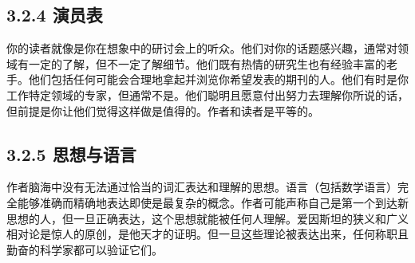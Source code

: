 \subsection*{3.2.4 演员表}
你的读者就像是你在想象中的研讨会上的听众。他们对你的话题感兴趣，通常对领域有一定的了解，但不一定了解细节。他们既有热情的研究生也有经验丰富的老手。他们包括任何可能会合理地拿起并浏览你希望发表的期刊的人。他们有时是你工作特定领域的专家，但通常不是。他们聪明且愿意付出努力去理解你所说的话，但前提是你让他们觉得这样做是值得的。作者和读者是平等的。

\subsection*{3.2.5 思想与语言}
作者脑海中没有无法通过恰当的词汇表达和理解的思想。语言（包括数学语言）完全能够准确而精确地表达即使是最复杂的概念。作者可能声称自己是第一个到达新思想的人，但一旦正确表达，这个思想就能被任何人理解。爱因斯坦的狭义和广义相对论是惊人的原创，是他天才的证明。但一旦这些理论被表达出来，任何称职且勤奋的科学家都可以验证它们。


